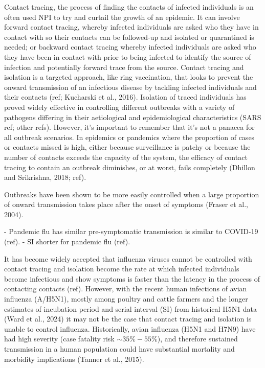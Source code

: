 \documentclass{article}
\begin{document}
Contact tracing, the process of finding the contacts of infected individuals is an often used NPI to try and curtail the growth of an epidemic. It can involve forward contact tracing, whereby infected individuals are asked who they have in contact with so their contacts can be followed-up and isolated or quarantined is needed; or backward contact tracing whereby infected individuals are asked who they have been in contact with prior to being infected to identify the source of infection and potentially forward trace from the source. Contact tracing and isolation is a targeted approach, like ring vaccination, that looks to prevent the onward transmission of an infectious disease by tackling infected individuals and their contacts (ref; Kucharski et al., 2016). Isolation of traced individuals has proved widely effective in controlling different outbreaks with a variety of pathogens differing in their aetiological and epidemiological characteristics (SARS ref; other refs). However, it's important to remember that it's not a panacea for all outbreak scenarios. In epidemics or pandemics where the proportion of cases or contacts missed is high, either because surveillance is patchy or because the number of contacts exceeds the capacity of the system, the efficacy of contact tracing to contain an outbreak diminishes, or at worst, fails completely (Dhillon and Srikrishna, 2018; ref).

Outbreaks have been shown to be more easily controlled when a large proportion of onward transmission takes place after the onset of symptoms (Fraser et al., 2004).

- Pandemic flu has similar pre-symptomatic transmission is similar to COVID-19 (ref).
- SI shorter for pandemic flu (ref).

It has become widely accepted that influenza viruses cannot be controlled with contact tracing and isolation become the rate at which infected individuals become infectious and show symptoms is faster than the latency in the process of contacting contacts (ref). However, with the recent human infections of avian influenza (A/H5N1), mostly among poultry and cattle farmers and the longer estimates of incubation period and serial interval (SI) from historical H5N1 data (Ward et al., 2024) it may not be the case that contact tracing and isolation is unable to control influenza. Historically, avian influenza (H5N1 and H7N9) have had high severity (case fatality risk $\sim 35\%-55\%$), and therefore sustained transmission in a human population could have substantial mortality and morbidity implications (Tanner et al., 2015). \\
\end{document}
